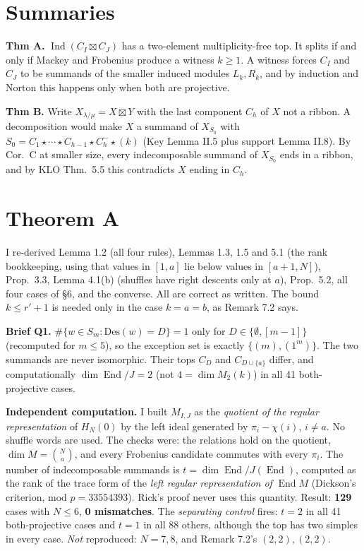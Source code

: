 \documentclass[11pt]{article}
\newcommand{\Ind}{\operatorname{Ind}}
\newcommand{\End}{\operatorname{End}}
\begin{document}
\section{Summaries}
\textbf{Thm A.} $\Ind(C_I\boxtimes C_J)$ has a two-element multiplicity-free top. It splits if and
only if Mackey and Frobenius produce a witness $k\ge1$. A witness forces $C_I$ and $C_J$ to be
summands of the smaller induced modules $L_k,R_k$, and by induction and Norton this happens only
when both are projective.

\textbf{Thm B.} Write $X_{\lambda/\mu}=X\boxtimes Y$ with the last component $C_h$ of $X$ not a
ribbon. A decomposition would make $X$ a summand of $X_{S_0}$ with
$S_0=C_1\star\cdots\star C_{h-1}\star C_h^-\star(k)$ (Key Lemma II.5 plus support Lemma II.8).
By Cor.~C at smaller size, every indecomposable summand of $X_{S_0}$ ends in a ribbon, and by KLO
Thm.~5.5 this contradicts $X$ ending in $C_h$.

\section{Theorem A}
I re-derived Lemma 1.2 (all four rules), Lemmas 1.3, 1.5 and 5.1 (the rank bookkeeping, using that
values in $[1,a]$ lie below values in $[a+1,N]$), Prop.~3.3, Lemma 4.1(b) (shuffles have right
descents only at $a$), Prop.~5.2, all four cases of \S6, and the converse. All are correct as
written. The bound $k\le r'+1$ is needed only in the case $k=a=b$, as Remark 7.2 says.

\textbf{Brief Q1.} $\#\{w\in S_m:\mathrm{Des}(w)=D\}=1$ only for $D\in\{\emptyset,[m-1]\}$
(recomputed for $m\le5$), so the exception set is exactly $\{(m),(1^m)\}$. The two summands are
never isomorphic. Their tops $C_D$ and $C_{D\cup\{a\}}$ differ, and computationally
$\dim\End/J=2$ (not $4=\dim M_2(k)$) in all 41 both-projective cases.

\textbf{Independent computation.} I built $M_{I,J}$ as the \emph{quotient of the regular
representation} of $H_N(0)$ by the left ideal generated by $\pi_i-\chi(i)$, $i\ne a$. No shuffle
words are used. The checks were: the relations hold on the quotient, $\dim M=\binom Na$, and every
Frobenius candidate commutes with every $\pi_i$. The number of indecomposable summands is
$t=\dim \End/J(\End)$, computed as the rank of the trace form of the \emph{left regular
representation of} $\End M$ (Dickson's criterion, mod $p=33554393$). Rick's proof never uses this
quantity. Result: \textbf{129} cases with $N\le6$, \textbf{0 mismatches}. The \emph{separating
control} fires: $t=2$ in all 41 both-projective cases and $t=1$ in all 88 others, although the top
has two simples in every case. \emph{Not} reproduced: $N=7,8$, and Remark 7.2's $(2,2),(2,2)$.
\end{document}
